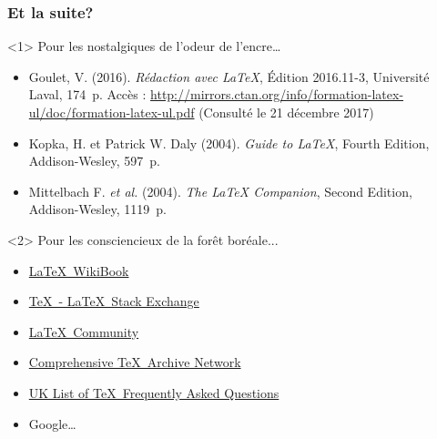 \begin{frame}

	\frametitle{Et la suite?}
	
	\begin{onlyenv}
		Pour les nostalgiques de l'odeur de l'encre\dots
		
		\begin{itemize}
			\item Goulet, V. (2016). \textit{Rédaction avec {\LaTeX}}, Édition 2016.11-3, Université Laval, 174~p. Accès : \href{http://mirrors.ctan.org/info/formation-latex-ul/doc/formation-latex-ul.pdf}{%
			http://mirrors.ctan.org/info/formation-latex-ul/doc/formation-latex-ul.pdf} (Consulté le 21 décembre 2017)
			\item Kopka, H. et Patrick W. Daly (2004). \textit{Guide to {\LaTeX}}, Fourth Edition, Addison-Wesley, 597~p.
			\item Mittelbach F. \textit{et al.} (2004). \textit{The {\LaTeX} Companion}, Second Edition, Addison-Wesley, 1119~p.
		\end{itemize}	
	\end{onlyenv}

	\begin{onlyenv}
		Pour les consciencieux de la forêt boréale...
		
		\begin{itemize}
			\item \href{https://en.wikibooks.org/wiki/LaTeX}{\LaTeX\ WikiBook}
			\item \href{https://tex.stackexchange.com/}{\TeX\ - \LaTeX\ Stack Exchange}
			\item \href{http://latex.org/forum/}{\LaTeX\ Community}
			\item \href{https://ctan.org/}{Comprehensive \TeX\ Archive Network}
			\item \href{http://www.tex.ac.uk/}{UK List of \TeX\ Frequently Asked Questions}
			\item Google\dots
		\end{itemize}
	\end{onlyenv}
\end{frame}
